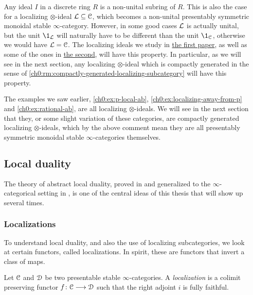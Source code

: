 Any ideal $I$ in a discrete ring $R$ is a non-unital subring of $R$. This is also the case for a localizing $\otimes$-ideal $\mathcal{L}\subseteq \EuScript{C}$, which becomes a non-unital presentably symmetric monoidal stable $\infty$-category. However, in some good cases $\mathcal{L}$ is actually unital, but the unit $\1_\L$ will naturally have to be different than the unit $\1_\C$, otherwise we would have $\mathcal{L}=\EuScript{C}$. The localizing ideals we study in \hyperref[ch1]{the first paper}, as well as some of the ones in \hyperref[ch2]{the second}, will have this property. In particular, as we will see in the next section, any localizing $\otimes$-ideal which is compactly generated in the sense of \cref{ch0:rm:compactly-generated-localizing-subcategory} will have this property.

\begin{example}
    The examples we saw earlier, \cref{ch0:ex:p-local-ab}, \cref{ch0:ex:localizing-away-from-p} and \cref{ch0:ex:rational-ab}, are all localizing $\otimes$-ideals. We will see in the next section that they, or some slight variation of these categories, are compactly generated localizing $\otimes$-ideals, which by the above comment mean they are all presentably symmetric monoidal stable $\infty$-categories themselves. 
\end{example}





\subsection{Local duality}
\label{ch0:ssec:local-duality}

The theory of abstract local duality, proved in \cite{hovey-palmiery-strickland_97} and generalized to the $\infty$-categorical setting in \cite{barthel-heard-valenzuela_2018}, is one of the central ideas of this thesis that will show up several times. 

\subsubsection{Localizations}

To understand local duality, and also the use of localizing subcategories, we look at certain functors, called localizations. In spirit, these are functors that invert a class of maps. 

\begin{definition}
    \label{ch0:def:localization}
    Let $\EuScript{C}$ and $\EuScript{D}$ be two presentable stable $\infty$-categories. A \emph{localization} is a colimit preserving functor $f\colon \EuScript{C}\longrightarrow \EuScript{D}$ such that the right adjoint $i$ is fully faithful.  
\end{definition}

